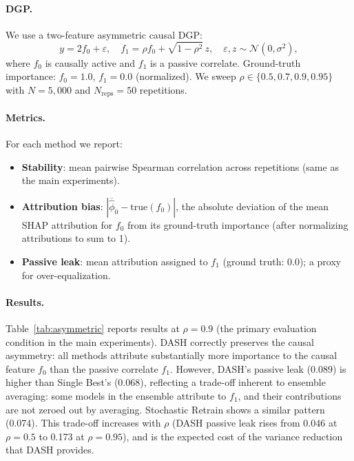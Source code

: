 \documentclass[10pt]{article}
\newcommand{\dash}{\textsc{DASH}}
\begin{document}
\paragraph{DGP.}
We use a two-feature asymmetric causal DGP:
\[
  y = 2 f_0 + \varepsilon, \quad
  f_1 = \rho f_0 + \sqrt{1 - \rho^2}\, z, \quad
  \varepsilon, z \sim \mathcal{N}(0, \sigma^2),
\]
where $f_0$ is causally active and $f_1$ is a passive correlate.
Ground-truth importance: $f_0 = 1.0$, $f_1 = 0.0$ (normalized).
We sweep $\rho \in \{0.5, 0.7, 0.9, 0.95\}$ with $N = 5{,}000$ and
$N_{\text{reps}} = 50$ repetitions.

\paragraph{Metrics.}
For each method we report:
\begin{itemize}
  \item \textbf{Stability}: mean pairwise Spearman correlation across
    repetitions (same as the main experiments).
  \item \textbf{Attribution bias}: $|\overline{\hat{\phi}}_0 - \text{true}(f_0)|$,
    the absolute deviation of the mean SHAP attribution for $f_0$ from its
    ground-truth importance (after normalizing attributions to sum to 1).
  \item \textbf{Passive leak}: mean attribution assigned to $f_1$
    (ground truth: 0.0); a proxy for over-equalization.
\end{itemize}

\paragraph{Results.}
Table~\ref{tab:asymmetric} reports results at $\rho = 0.9$ (the
primary evaluation condition in the main experiments).
\dash{} correctly preserves the causal asymmetry: all methods attribute
substantially more importance to the causal feature $f_0$ than the
passive correlate $f_1$. However, \dash{}'s passive leak (0.089) is
higher than Single Best's (0.068), reflecting a trade-off inherent to
ensemble averaging: some models in the ensemble attribute to $f_1$, and
their contributions are not zeroed out by averaging. Stochastic Retrain
shows a similar pattern (0.074). This trade-off increases with $\rho$
(DASH passive leak rises from 0.046 at $\rho{=}0.5$ to 0.173 at
$\rho{=}0.95$), and is the expected cost of the variance reduction
that \dash{} provides.
\end{document}
